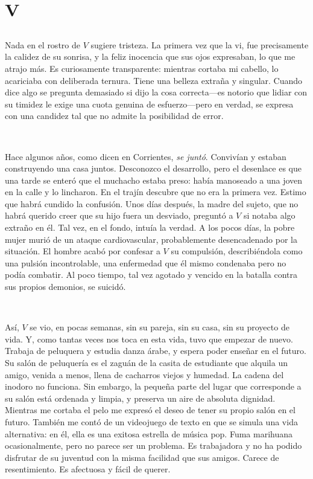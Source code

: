 \documentclass[a4paper, 12pt]{article}
\begin{document}
\section{V}

\subsection{}

Nada en el rostro de $V$ sugiere tristeza. La primera vez que la vi, fue
precisamente la calidez de su sonrisa, y la feliz inocencia que sus ojos
expresaban, lo que me atrajo más. Es curiosamente transparente: mientras
cortaba mi cabello, lo acariciaba con deliberada ternura. Tiene una belleza
extraña y singular. Cuando dice algo se pregunta demasiado si dijo la cosa
correcta---es notorio que lidiar con su timidez le exige una cuota genuina de
esfuerzo---pero en verdad, se expresa con una candidez tal que no admite la
posibilidad de error.

~ 

Hace algunos años, como dicen en Corrientes, \textit{se juntó}. Convivían y
estaban construyendo una casa juntos. Desconozco el desarrollo, pero el
desenlace es que una tarde se enteró que el muchacho estaba preso: había
manoseado a una joven en la calle y lo lincharon. En el trajín descubre que no
era la primera vez. Estimo que habrá cundido la confusión. Unos días después,
la madre del sujeto, que no habrá querido creer que su hijo fuera un desviado,
preguntó a $V$ si notaba algo extraño en él. Tal vez, en el fondo, intuía la
verdad. A los pocos días, la pobre mujer murió de un ataque cardiovascular,
probablemente desencadenado por la situación. El hombre acabó por confesar a
$V$ su compulsión, describiéndola como una pulsión incontrolable, una
enfermedad que él mismo condenaba pero no podía combatir. Al poco tiempo, tal
vez agotado y vencido en la batalla contra sus propios demonios, se suicidó.

~

Así, $V$ se vio, en pocas semanas, sin su pareja, sin su casa, sin su proyecto
de vida. Y, como tantas veces nos toca en esta vida, tuvo que empezar de nuevo.
Trabaja de peluquera y estudia danza árabe, y espera poder enseñar en el
futuro. Su salón de peluquería es el zaguán de la casita de estudiante que
alquila un amigo, venida a menos, llena de cacharros viejos y humedad. La
cadena del inodoro no funciona. Sin embargo, la pequeña parte del lugar que
corresponde a su salón está ordenada y limpia, y preserva un aire de absoluta
dignidad. Mientras me cortaba el pelo me expresó el deseo de tener su propio
salón en el futuro. También me contó de un videojuego de texto en que se simula
una vida alternativa: en él, ella es una exitosa estrella de música pop. Fuma
marihuana ocasionalmente, pero no parece ser un problema. Es trabajadora y no
ha podido disfrutar de su juventud con la misma facilidad que sus amigos.
Carece de resentimiento. Es afectuosa y fácil de querer.
\end{document}
